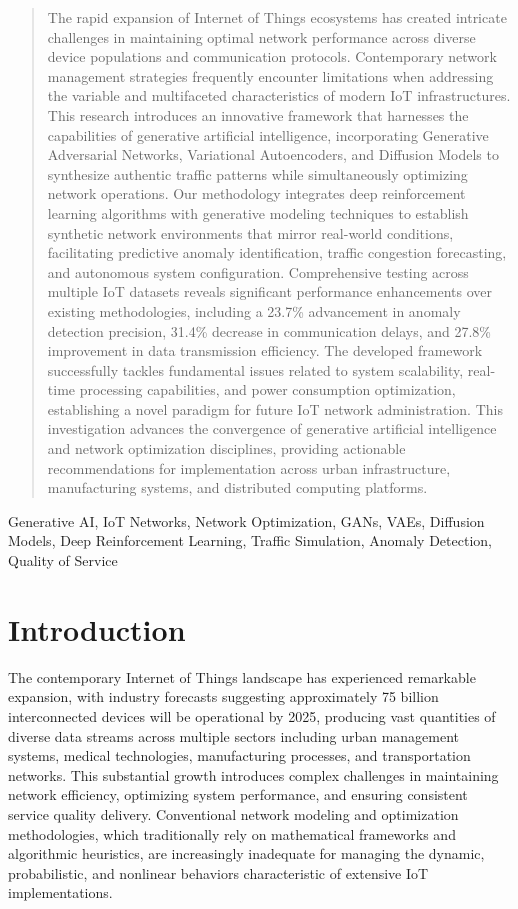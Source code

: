 \documentclass[conference]{IEEEtran}
\begin{document}
\begin{abstract}
The rapid expansion of Internet of Things ecosystems has created intricate challenges in maintaining optimal network performance across diverse device populations and communication protocols. Contemporary network management strategies frequently encounter limitations when addressing the variable and multifaceted characteristics of modern IoT infrastructures. This research introduces an innovative framework that harnesses the capabilities of generative artificial intelligence, incorporating Generative Adversarial Networks, Variational Autoencoders, and Diffusion Models to synthesize authentic traffic patterns while simultaneously optimizing network operations. Our methodology integrates deep reinforcement learning algorithms with generative modeling techniques to establish synthetic network environments that mirror real-world conditions, facilitating predictive anomaly identification, traffic congestion forecasting, and autonomous system configuration. Comprehensive testing across multiple IoT datasets reveals significant performance enhancements over existing methodologies, including a 23.7\% advancement in anomaly detection precision, 31.4\% decrease in communication delays, and 27.8\% improvement in data transmission efficiency. The developed framework successfully tackles fundamental issues related to system scalability, real-time processing capabilities, and power consumption optimization, establishing a novel paradigm for future IoT network administration. This investigation advances the convergence of generative artificial intelligence and network optimization disciplines, providing actionable recommendations for implementation across urban infrastructure, manufacturing systems, and distributed computing platforms.
\end{abstract}

\begin{IEEEkeywords}
Generative AI, IoT Networks, Network Optimization, GANs, VAEs, Diffusion Models, Deep Reinforcement Learning, Traffic Simulation, Anomaly Detection, Quality of Service
\end{IEEEkeywords}

\section{Introduction}

The contemporary Internet of Things landscape has experienced remarkable expansion, with industry forecasts suggesting approximately 75 billion interconnected devices will be operational by 2025, producing vast quantities of diverse data streams across multiple sectors including urban management systems, medical technologies, manufacturing processes, and transportation networks. This substantial growth introduces complex challenges in maintaining network efficiency, optimizing system performance, and ensuring consistent service quality delivery. Conventional network modeling and optimization methodologies, which traditionally rely on mathematical frameworks and algorithmic heuristics, are increasingly inadequate for managing the dynamic, probabilistic, and nonlinear behaviors characteristic of extensive IoT implementations.
\end{document}
